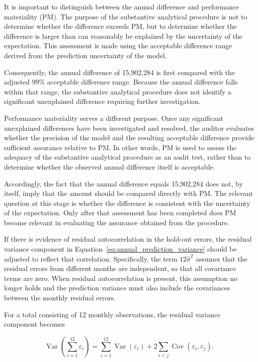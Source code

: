 It is important to distinguish between the annual difference and performance materiality (PM). The purpose of the substantive analytical procedure is not to determine whether the difference exceeds PM, but to determine whether the difference is larger than can reasonably be explained by the uncertainty of the expectation. This assessment is made using the acceptable difference range derived from the prediction uncertainty of the model.

Consequently, the annual difference of 15,902,284 is first compared with the adjusted 99\% acceptable difference range. Because the annual difference falls within that range, the substantive analytical procedure does not identify a significant unexplained difference requiring further investigation.

Performance materiality serves a different purpose. Once any sig\-ni\-ficant unexplained differences have been investigated and resolved, the auditor evaluates whether the precision of the model and the resulting acceptable difference provide sufficient assurance relative to PM. In other words, PM is used to assess the adequacy of the substantive analytical procedure as an audit test, rather than to determine whether the observed annual difference itself is acceptable.

Accordingly, the fact that the annual difference equals 15,902,284 does not, by itself, imply that the amount should be compared directly with PM. The relevant question at this stage is whether the difference is consistent with the uncertainty of the expectation. Only after that assessment has been completed does PM become relevant in evaluating the assurance obtained from the procedure.

\medskip
If there is evidence of residual autocorrelation in the hold-out errors, the residual variance component in Equation~\ref{eq:annual_prediction_variance} should be adjusted to reflect that correlation. Specifically, the term \(12\hat{\sigma}^2\) assumes that the residual errors from different months are independent, so that all covariance terms are zero. When residual autocorrelation is present, this assumption no longer holds and the prediction variance must also include the covariances between the monthly residual errors.

For a total consisting of 12 monthly observations, the residual variance component becomes

\[
\operatorname{Var}\!\left(\sum_{i=1}^{12}\varepsilon_i\right)
=
\sum_{i=1}^{12}\operatorname{Var}(\varepsilon_i)
+
2\sum_{i<j}\operatorname{Cov}(\varepsilon_i,\varepsilon_j).
\]

